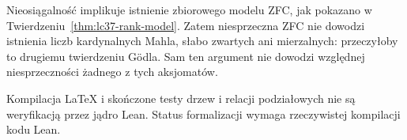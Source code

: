 \begin{uwaga}
\label{rem:lc38-consistency}
Nieosiągalność implikuje
istnienie zbiorowego
modelu ZFC, jak pokazano
w Twierdzeniu~\ref{thm:lc37-rank-model}.
Zatem niesprzeczna ZFC nie
dowodzi istnienia liczb kardynalnych
Mahla, słabo zwartych ani
mierzalnych: przeczyłoby to
drugiemu twierdzeniu Gödla.
Sam ten argument nie dowodzi
względnej niesprzeczności
żadnego z tych aksjomatów.
\end{uwaga}

\begin{uwaga}
\label{rem:lc38-formal}
Kompilacja LaTeX i skończone
testy drzew i relacji podziałowych
nie są weryfikacją przez jądro Lean.
Status formalizacji wymaga
rzeczywistej kompilacji kodu Lean.
\end{uwaga}
